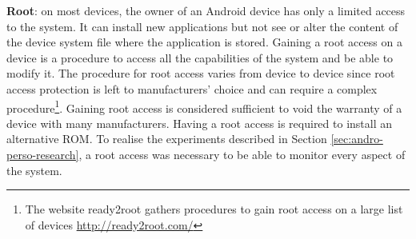 \textbf{Root}: on most devices, the owner of an Android device has only a limited access to the system.
It can install new applications but not see or alter the content of the device system file where the application is stored.
Gaining a root access on a device is a procedure to access all the capabilities of the system and be able to modify it.
The procedure for root access varies from device to device since root access protection is left to manufacturers' choice and can require a complex procedure\footnote{The website ready2root gathers procedures to gain root access on a large list of devices \url{http://ready2root.com/}}.
Gaining root access is considered sufficient to void the warranty of a device with many manufacturers.
Having a root access is required to install an alternative ROM.
To realise the experiments described in Section \ref{sec:andro-perso-research}, a root access was necessary to be able to monitor every aspect of the system.

